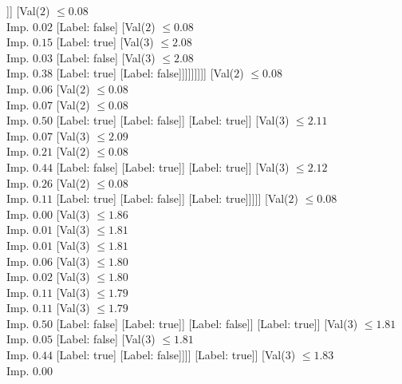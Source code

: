 \documentclass[margin=10pt]{standalone}
\begin{document}
\begin{forest}
												]]
										[Val($2$) $ \leq 0.08$ \\ Imp. $0.02$
											[Label: false]
											[Val($2$) $ \leq 0.08$ \\ Imp. $0.15$
												[Label: true]
												[Val($3$) $ \leq 2.08$ \\ Imp. $0.03$
													[Label: false]
													[Val($3$) $ \leq 2.08$ \\ Imp. $0.38$
														[Label: true]
														[Label: false]]]]]]]]]
						[Val($2$) $ \leq 0.08$ \\ Imp. $0.06$
							[Val($2$) $ \leq 0.08$ \\ Imp. $0.07$
								[Val($2$) $ \leq 0.08$ \\ Imp. $0.50$
									[Label: true]
									[Label: false]]
								[Label: true]]
							[Val($3$) $ \leq 2.11$ \\ Imp. $0.07$
								[Val($3$) $ \leq 2.09$ \\ Imp. $0.21$
									[Val($2$) $ \leq 0.08$ \\ Imp. $0.44$
										[Label: false]
										[Label: true]]
									[Label: true]]
								[Val($3$) $ \leq 2.12$ \\ Imp. $0.26$
									[Val($2$) $ \leq 0.08$ \\ Imp. $0.11$
										[Label: true]
										[Label: false]]
									[Label: true]]]]]
					[Val($2$) $ \leq 0.08$ \\ Imp. $0.00$
						[Val($3$) $ \leq 1.86$ \\ Imp. $0.01$
							[Val($3$) $ \leq 1.81$ \\ Imp. $0.01$
								[Val($3$) $ \leq 1.81$ \\ Imp. $0.06$
									[Val($3$) $ \leq 1.80$ \\ Imp. $0.02$
										[Val($3$) $ \leq 1.80$ \\ Imp. $0.11$
											[Val($3$) $ \leq 1.79$ \\ Imp. $0.11$
												[Val($3$) $ \leq 1.79$ \\ Imp. $0.50$
													[Label: false]
													[Label: true]]
												[Label: false]]
											[Label: true]]
										[Val($3$) $ \leq 1.81$ \\ Imp. $0.05$
											[Label: false]
											[Val($3$) $ \leq 1.81$ \\ Imp. $0.44$
												[Label: true]
												[Label: false]]]]
									[Label: true]]
								[Val($3$) $ \leq 1.83$ \\ Imp. $0.00$

\end{forest}
\end{document}
